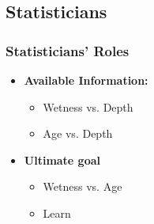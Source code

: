 \documentclass{beamer}
\begin{document}
\subsection{Statisticians}
\begin{frame}
\frametitle{Statisticians' Roles}
\begin{itemize}
\item<1-> \textbf{Available Information:} 
    \begin{multicols}{2}	
    	\begin{itemize}
    \item Wetness vs. Depth
    \item Age vs. Depth
	\end{itemize}
    \end{multicols}


\item<2-> \textbf{Ultimate goal}
    \begin{multicols}{2}	
    	\begin{itemize}
    \item Wetness vs. Age
    \item Learn
	\end{itemize}
    \end{multicols}
    \end{itemize}
\end{frame}
\end{document}
